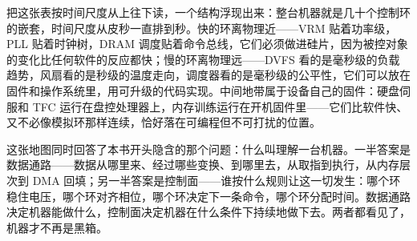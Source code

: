 把这张表按时间尺度从上往下读，一个结构浮现出来：整台机器就是几十个控制环的嵌套，时间尺度从皮秒一直排到秒。快的环离物理近——VRM 贴着功率级，PLL 贴着时钟树，DRAM 调度贴着命令总线，它们必须做进硅片，因为被控对象的变化比任何软件的反应都快；慢的环离物理远——DVFS 看的是毫秒级的负载趋势，风扇看的是秒级的温度走向，调度器看的是毫秒级的公平性，它们可以放在固件和操作系统里，用可升级的代码实现。中间地带属于设备自己的固件：硬盘伺服和 TFC 运行在盘控处理器上，内存训练运行在开机固件里——它们比软件快、又不必像模拟环那样连续，恰好落在可编程但不可打扰的位置。

这张地图同时回答了本书开头隐含的那个问题：什么叫理解一台机器。一半答案是数据通路——数据从哪里来、经过哪些变换、到哪里去，从取指到执行，从内存层次到 DMA 回填；另一半答案是控制面——谁按什么规则让这一切发生：哪个环稳住电压，哪个环对齐相位，哪个环决定下一条命令，哪个环分配时间。数据通路决定机器能做什么，控制面决定机器在什么条件下持续地做下去。两者都看见了，机器才不再是黑箱。
